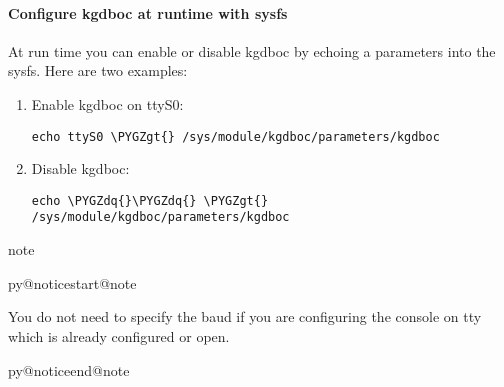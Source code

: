 \documentclass[a4paper,8pt,english]{sphinxmanual}
\makeatletter
\renewenvironment{notice}[2]{%
          \def\py@noticetype{#1}
          \begin{coloredbox}{#1}
          \bf\it
          \par\strong{#2}
          \csname py@noticestart@#1\endcsname
        }
	{
          \csname py@noticeend@\py@noticetype\endcsname
          \end{coloredbox}
        }
\def\PYGZgt{\char`\>}
\def\PYGZdq{\char`\"}
\makeatother
\begin{document}
\paragraph{Configure kgdboc at runtime with sysfs}
\label{dev-tools/kgdb:configure-kgdboc-at-runtime-with-sysfs}
At run time you can enable or disable kgdboc by echoing a parameters
into the sysfs. Here are two examples:
\begin{enumerate}
\item {} 
Enable kgdboc on ttyS0:

\begin{Verbatim}[commandchars=\\\{\}]
echo ttyS0 \PYGZgt{} /sys/module/kgdboc/parameters/kgdboc
\end{Verbatim}

\item {} 
Disable kgdboc:

\begin{Verbatim}[commandchars=\\\{\}]
echo \PYGZdq{}\PYGZdq{} \PYGZgt{} /sys/module/kgdboc/parameters/kgdboc
\end{Verbatim}

\end{enumerate}

\begin{notice}{note}{Note:}
You do not need to specify the baud if you are configuring the
console on tty which is already configured or open.
\end{notice}
\end{document}
